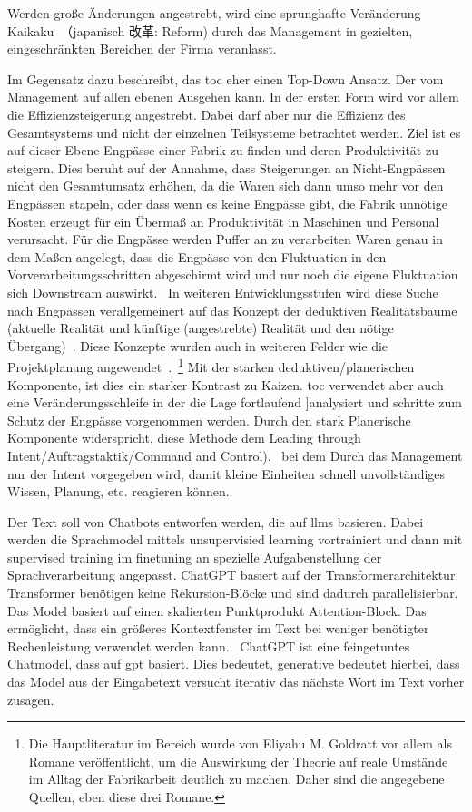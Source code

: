 \documentclass[acmlarge,authorversion,nonacm]{acmart}
\begin{document}
Werden große Änderungen angestrebt, wird eine sprunghafte Veränderung Kaikaku~（japanisch 改革: Reform) durch das Management in gezielten, eingeschränkten Bereichen der Firma veranlasst.

Im Gegensatz dazu beschreibt, das \gls{toc} eher einen Top-Down Ansatz. Der vom Management auf allen ebenen Ausgehen kann. In der ersten Form wird vor allem die Effizienzsteigerung angestrebt. Dabei darf aber nur die Effizienz des Gesamtsystems und nicht der einzelnen Teilsysteme betrachtet werden. Ziel ist es auf dieser Ebene Engpässe einer Fabrik zu finden und deren Produktivität zu steigern. Dies beruht auf der Annahme, dass Steigerungen an Nicht-Engpässen nicht den Gesamtumsatz erhöhen, da die Waren sich dann umso mehr vor den Engpässen stapeln, oder dass wenn es keine Engpässe gibt, die Fabrik unnötige Kosten erzeugt für ein Übermaß an Produktivität in Maschinen und Personal verursacht. Für die Engpässe werden Puffer an zu verarbeiten Waren genau in dem Maßen angelegt, dass die Engpässe von den Fluktuation in den Vorverarbeitungsschritten abgeschirmt wird und nur noch die eigene Fluktuation sich Downstream auswirkt.~\cite{goldratt_goal_2012} In weiteren Entwicklungsstufen wird diese Suche nach Engpässen verallgemeinert auf das Konzept der deduktiven Realitätsbaume (aktuelle Realität und künftige (angestrebte) Realität und den nötige Übergang)~\cite{goldratt_its_2011}. Diese Konzepte wurden auch in weiteren Felder wie die Projektplanung angewendet~\cite{goldratt_critical_2002}.~\footnote{Die Hauptliteratur im Bereich wurde von Eliyahu M. Goldratt vor allem als Romane veröffentlicht, um die Auswirkung der Theorie auf reale Umstände im Alltag der Fabrikarbeit deutlich zu machen. Daher sind die angegebene Quellen, eben diese drei Romane.} Mit der starken deduktiven/planerischen Komponente, ist dies ein starker Kontrast zu Kaizen. \gls{toc} verwendet aber auch eine Veränderungsschleife in der die Lage fortlaufend ]analysiert und schritte zum Schutz der Engpässe vorgenommen werden. Durch den stark  Planerische Komponente widerspricht, diese Methode dem Leading through Intent/Auftragstaktik/Command and Control).~\cite{bungay_art_2011} bei dem Durch das Management nur der Intent vorgegeben wird, damit kleine Einheiten schnell unvollständiges Wissen, Planung, etc. reagieren können.


Der Text soll von Chatbots entworfen werden, die auf \glspl{llm} basieren.
Dabei werden die Sprachmodel mittels unsupervisied learning vortrainiert und dann mit supervised training im finetuning an spezielle Aufgabenstellung der Sprachverarbeitung angepasst. ChatGPT basiert auf der Transformerarchitektur. Transformer benötigen keine Rekursion-Blöcke und sind dadurch parallelisierbar. Das Model basiert auf einen skalierten Punktprodukt Attention-Block. Das ermöglicht, dass ein größeres Kontextfenster im Text bei weniger benötigter Rechenleistung verwendet werden kann.~\cite{vaswani_attention_2023} ChatGPT ist eine feingetuntes Chatmodel, dass auf \gls{gpt} basiert.
Dies bedeutet, generative bedeutet hierbei, dass das Model aus der Eingabetext versucht iterativ das nächste Wort im Text vorher zusagen.~\cite{raschka_build_2025}
\end{document}
